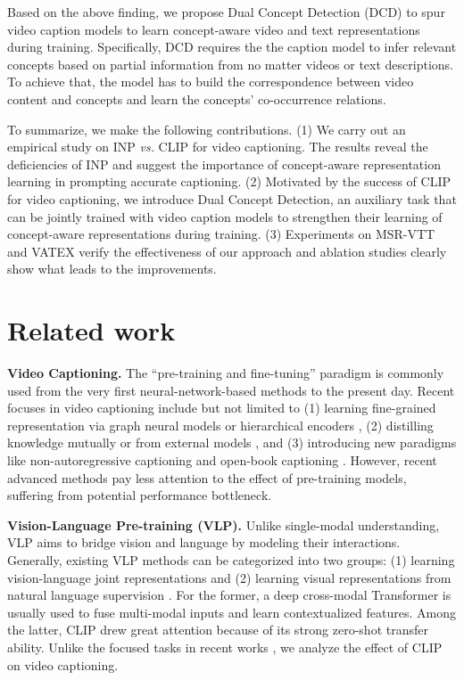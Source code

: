 \documentclass[runningheads]{llncs}
\newcommand\vs{\textit{vs.}}
\begin{document}
Based on the above finding, we propose Dual Concept Detection (DCD) to spur video caption models to learn concept-aware video and text representations during training. Specifically, DCD requires the the caption model to infer relevant concepts based on partial information from no matter videos or text descriptions. 
To achieve that, the model has to build the correspondence between video content and concepts and learn the concepts' co-occurrence relations. 


To summarize, we make the following contributions. (1) We carry out an empirical study on INP \vs{} CLIP for video captioning. The results reveal the deficiencies of INP and suggest the importance of concept-aware representation learning in prompting accurate captioning. (2) Motivated by the success of CLIP for video captioning, we introduce Dual Concept Detection, an auxiliary task that can be jointly trained with video caption models to strengthen their learning of concept-aware representations during training. (3) Experiments on MSR-VTT\cite{xu2016msr} and VATEX \cite{wang2019vatex} verify the effectiveness of our approach and ablation studies clearly show what leads to the improvements.


\section{Related work}

\textbf{Video Captioning.} The ``pre-training and fine-tuning'' paradigm is commonly used from the very first neural-network-based methods \cite{venugopalan2015sequence,venugopalan2015translating} to the present day. Recent focuses in video captioning include but not limited to (1) learning fine-grained representation via graph neural models \cite{pan2020spatio,zhang2020object,chen2021motion} or hierarchical encoders \cite{yang2021visual}, (2) distilling knowledge mutually \cite{lin2021augmented} or from external models \cite{zhang2020object}, and (3) introducing new paradigms like non-autoregressive captioning \cite{yang2021non,liu2021o2na} and open-book captioning \cite{zhang2021open}. However, recent advanced methods pay less attention to the effect of pre-training models, suffering from potential performance bottleneck. 


\noindent\textbf{Vision-Language Pre-training (VLP).} Unlike single-modal understanding, VLP aims to bridge vision and language by modeling their interactions. Generally, existing VLP methods can be categorized into two groups: (1) learning vision-language joint representations \cite{sun2019videobert,li2020oscar,li2020hero,DBLP:conf/icml/KimSK21,liu2021dimbert} and (2) learning visual representations from natural language supervision \cite{DBLP:conf/icml/RadfordKHRGASAM21,desai2021virtex,sariyildiz2020learning}. For the former, a deep cross-modal Transformer\cite{vaswani2017attention} is usually used to fuse multi-modal inputs and learn contextualized features. Among the latter, CLIP \cite{DBLP:conf/icml/RadfordKHRGASAM21} drew great attention because of its strong zero-shot transfer ability. Unlike the focused tasks in recent works \cite{luo2021clip4clip,shen2021much}, we analyze the effect of CLIP on video captioning.
\end{document}
